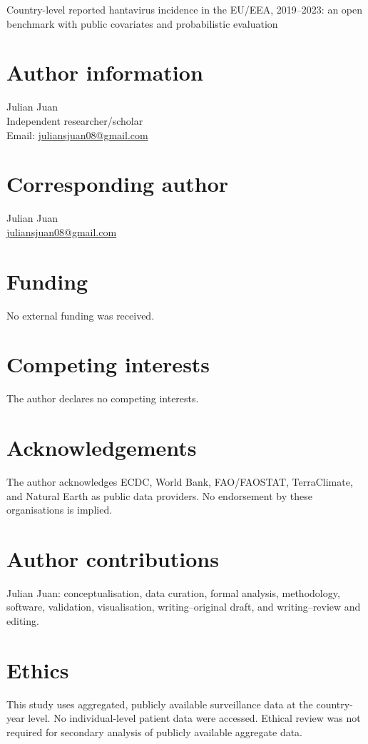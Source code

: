 \documentclass[11pt]{article}
\begin{document}
\begin{center}
{\Large Country-level reported hantavirus incidence in the EU/EEA, 2019--2023: an open benchmark with public covariates and probabilistic evaluation}
\end{center}

\section*{Author information}

Julian Juan\\
Independent researcher/scholar\\
Email: \href{mailto:juliansjuan08@gmail.com}{juliansjuan08@gmail.com}

\section*{Corresponding author}

Julian Juan\\
\href{mailto:juliansjuan08@gmail.com}{juliansjuan08@gmail.com}

\section*{Funding}

No external funding was received.

\section*{Competing interests}

The author declares no competing interests.

\section*{Acknowledgements}

The author acknowledges ECDC, World Bank, FAO/FAOSTAT, TerraClimate, and Natural Earth as public data providers. No endorsement by these organisations is implied.

\section*{Author contributions}

Julian Juan: conceptualisation, data curation, formal analysis, methodology, software, validation, visualisation, writing--original draft, and writing--review and editing.

\section*{Ethics}

This study uses aggregated, publicly available surveillance data at the country-year level. No individual-level patient data were accessed. Ethical review was not required for secondary analysis of publicly available aggregate data.
\end{document}
